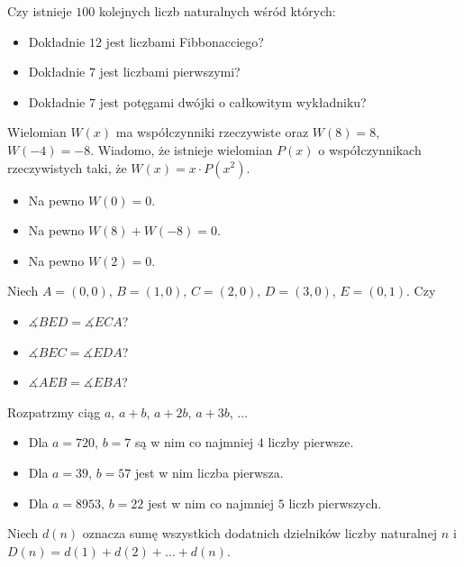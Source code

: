 \documentclass[12pt, a4paper]{article}
\newcommand{\question}[1]{\normalitem \begin{samepage}#1 \end{samepage}}
\newcommand{\questionwithasterix}[1]{ \asterixitem \begin{samepage}#1 \vspace{6cm}\end{samepage}}
\begin{document}
\begin{enumerate}
    \question {
		Czy istnieje $100$ kolejnych liczb naturalnych wśród których:
	
		\begin{itemize}
			\item Dokładnie $12$ jest liczbami Fibbonacciego?
			\item Dokładnie $7$ jest liczbami pierwszymi?
			\item Dokładnie $7$ jest potęgami dwójki o całkowitym wykładniku?
		\end{itemize}
		
	}
	
	\questionwithasterix {
		Wielomian $W(x)$ ma współczynniki rzeczywiste oraz $W(8) = 8$, $W(-4) = -8$. Wiadomo, że istnieje wielomian $P(x)$ o współczynnikach rzeczywistych taki, że $W(x) = x \cdot P(x^2)$.
	
		\begin{itemize}
			\item Na pewno $W(0) = 0$.
			\item Na pewno $W(8) + W(-8) = 0$.
			\item Na pewno $W(2) = 0$.
		\end{itemize}
	}
	
	\questionwithasterix{
		Niech $A=(0,0)$, $B=(1,0)$, $C=(2,0)$, $D=(3,0)$, $E=(0,1)$. Czy
	
		\begin{itemize}
			\item $\measuredangle BED = \measuredangle ECA$?
			\item $\measuredangle BEC = \measuredangle EDA$?
			\item $\measuredangle AEB = \measuredangle EBA$?
		\end{itemize}
	}
	
	\question{
		Rozpatrzmy ciąg $a$, $a+b$, $a+2b$, $a+3b$, $\ldots$
	
		\begin{itemize}
			\item Dla $a=720$, $b=7$ są w nim co najmniej $4$ liczby pierwsze.
			\item Dla $a=39$, $b=57$ jest w nim liczba pierwsza.
			\item Dla $a=8953$, $b=22$ jest w nim co najmniej $5$ liczb pierwszych.
		\end{itemize}
	}
	
	\question{
		Niech $d(n)$ oznacza sumę wszystkich dodatnich dzielników liczby naturalnej $n$ i $D(n) = d(1) + d(2) + \ldots + d(n)$.
	
}
\end{enumerate}
\end{document}

